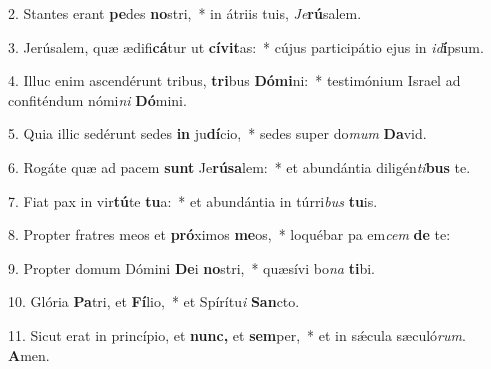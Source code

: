 \item 2. Stantes erant \textbf{pe}des \textbf{no}stri,~* in átriis tuis, \thinspace\textit{Je}\textbf{rú}salem.

\item 3. Jerúsalem, quæ ædifi\textbf{cá}tur ut \textbf{cívit}as:~* cújus participátio ejus in \textit{id}\textbf{í}psum.

\item 4. Illuc enim ascendérunt tribus, \textbf{tri}bus \textbf{Dómi}ni:~* testimónium Israel ad confiténdum nómi\textit{ni} \textbf{Dó}mini.

\item 5. Quia illic sedérunt sedes \textbf{in} ju\textbf{dí}cio,~* sedes super do\textit{mum} \textbf{Da}vid.

\item 6. Rogáte quæ ad pacem \textbf{sunt} Je\textbf{rúsa}lem:~* et abundántia diligén\textit{ti}\textbf{bus} te.

\item 7. Fiat pax in vir\textbf{tú}te \textbf{tu}a:~* et abundántia in túrri\textit{bus} \textbf{tu}is.

\item 8. Propter fratres meos et \textbf{pró}ximos \textbf{me}os,~* loquébar pa em\textit{cem} \textbf{de} te:

\item 9. Propter domum Dómini \textbf{De}i \textbf{no}stri,~* quæsívi bo\textit{na} \textbf{ti}bi.

\item 10. Glória \textbf{Pa}tri, et \textbf{Fí}lio,~* et Spírítu\textit{i} \textbf{San}cto.

\item 11. Sicut erat in princípio, et \textbf{nunc,} et \textbf{sem}per,~* et in sǽcula sæculó\textit{rum}. \textbf{A}men.